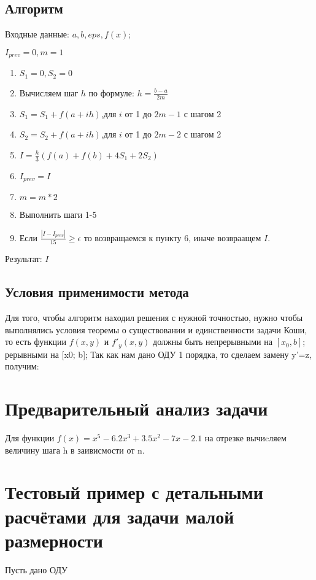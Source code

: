 \documentclass{article}
\begin{document}
	\subsection{Алгоритм}
	Входные данные: $a, b,  eps, f(x)$;  
	
	$I_{prev} = 0, m = 1$
	\begin{enumerate}
		\item $S_1 = 0, S_2 = 0$
		\item Вычисляем шаг $h$ по формуле: $h = \frac{b-a}{2m} $
		\item $S_1 = S_1 + f(a + ih)$,для $i$ от 1 до $2m-1$ с шагом 2
		\item $S_2 = S_2 + f(a + ih)$,для $i$ от 1 до $2m-2$ с шагом 2
		\item $I = \frac{h}{3}(f(a)+f(b)+4S_1+2S_2)$
		\item $I_{prev} = I$
		\item $m = m * 2$
		\item Выполнить шаги 1-5
		\item Если $\frac{|I-I_{prev}|}{15} \geq \epsilon$ то возвращаемся к пункту 6, иначе возвраащем $I$.
	\end{enumerate}
	
	Результат: $I$
	
	\subsection{Условия применимости метода}
	Для того, чтобы алгоритм находил решения с нужной точностью, нужно чтобы выполнялись условия теоремы о существовании и единственности задачи Коши, то есть функции $f(x, y)$ и $f'_y(x, y)$ должны быть непрерывными на $[x_0, b]$;
	рерывными на [x0; b];
	Так как нам дано ОДУ 1 порядка, то сделаем замену y’=z, получим:

	
	\section{Предварительный анализ задачи}
	Для функции $f(x) = x^5 - 6.2x^3 + 3.5x^2 -7x -2.1$ на отрезке
	вычиcляем величину шага h в заивисмости от n.
	
	\section{Тестовый пример с детальными расчётами для задачи малой размерности}
	Пусть дано ОДУ
	
\end{document}
